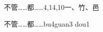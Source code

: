 \begin{entry}{不管……都……}{4,14,10}{⼀、⽵、⾢}
  \begin{phonetics}{不管……都……}{bu4guan3 dou1}
  \end{phonetics}
\end{entry}
